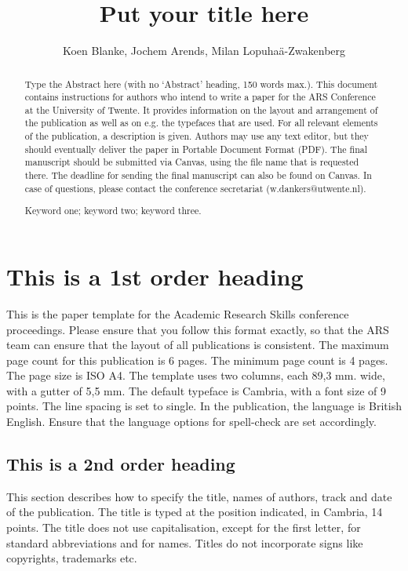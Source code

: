 \documentclass{paper}
\title{Put your title here}
\author{Koen Blanke, Jochem Arends, Milan Lopuhaä-Zwakenberg}
\begin{document}
\maketitle

\begin{abstract}

Type the Abstract here (with no ‘Abstract’ heading, 150 words max.).
This document contains instructions for authors who intend to write a paper for the ARS Conference at the University of Twente.
It provides information on the layout and arrangement of the publication as well as on e.g. the typefaces that are used.
For all relevant elements of the publication, a description is given.
Authors may use any text editor, but they should eventually deliver the paper in Portable Document Format (PDF).
The final manuscript should be submitted via
Canvas, using the file name that is requested there.
The deadline for sending the final manuscript can also be found on Canvas.
In case of questions, please contact the conference secretariat (w.dankers@utwente.nl).

\vspace{10pt}
Keyword one; keyword two; keyword three.

\end{abstract}

\section{This is a 1st order heading}

This is the paper template for the Academic Research Skills conference proceedings.
Please ensure that you follow this format exactly, so that the ARS team can ensure that the layout of all publications is consistent.
The maximum page count for this publication is 6 pages.
The minimum page count is 4 pages.
The page size is ISO A4.
The template uses two columns, each 89,3 mm.
wide, with a gutter of 5,5 mm.
The default typeface is Cambria, with a font size of 9 points.
The line spacing is set to single.
In the publication, the language is British English.
Ensure that the language options for spell-check are set accordingly.

\subsection{This is a 2nd order heading}

This section describes how to specify the title, names of authors, track and date of the publication.
The title is typed at the position indicated, in Cambria, 14 points.
The title does not use capitalisation, except for the first letter, for standard abbreviations and for names.
Titles do not incorporate signs like copyrights, trademarks etc.
\end{document}
